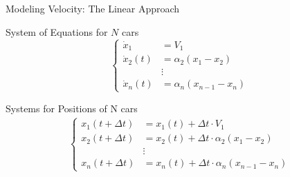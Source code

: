 \documentclass{beamer}
\begin{document}
\begin{frame}{Modeling Velocity: The Linear Approach}
	\begin{block}{System of Equations for $N$ cars}
		\[
		\left\{
		\begin{array}{ll}
			\dot{x}_1 &= V_1 \\
			\dot{x}_2(t) &= \alpha_2(x_1 - x_2) \\
			&\vdots \\
			\dot{x}_n(t) &= \alpha_n(x_{n-1} - x_n)
		\end{array}
		\right.
		\]
	\end{block}
	
	\begin{block}{Systems for Positions of N cars}
		\begin{align*}
			\left\{
			\begin{array}{ll}
				x_1(t + \Delta t) &= x_1(t) + \Delta t  \cdot V_1\\
				x_2(t + \Delta t) &= x_2(t) + \Delta t  \cdot \alpha_2(x_1 - x_2) \\
				&\vdots \\
				x_n(t + \Delta t) &= x_n(t) + \Delta t \cdot  \alpha_n(x_{n-1} - x_n)
			\end{array}
			\right.
		\end{align*}
	\end{block}
	
\end{frame}
\end{document}
